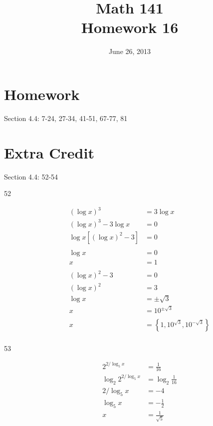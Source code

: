 \documentclass{exam}
\date{June 26, 2013}
\author{}
\title{Math 141 \\ Homework 16}
\begin{document}
    \maketitle

    \section{Homework}

    Section 4.4: 7-24, 27-34, 41-51, 67-77, 81

    \section{Extra Credit}
    Section 4.4: 52-54

    \ifprintanswers
      \begin{description}
        \item[52] 
          \begin{align*}
            (\log x)^3                &= 3 \log x \\
            (\log x)^3 - 3 \log x     &= 0 \\
            \log x \left[(\log x)^2 - 3 \right] &= 0 \\
            \\
            \log x &= 0 \\
            x      &= 1 \\
            \\
            (\log x)^2 - 3 &= 0 \\
            (\log x)^2     &= 3 \\
            \log x         &= \pm \sqrt{3} \\
            x              &= 10^{\pm \sqrt{3}} \\
            \\
            x &= \boxed{\left\{ 1, 10^{\sqrt{3}}, 10^{ - \sqrt{3}} \right\} } \\
          \end{align*}
          
        \item[53] 
          \begin{align*}
            2^{2/\log_5 x}        &= \frac{1}{16} \\
            \log_2 2^{2/\log_5 x} &= \log_2 \frac{1}{16} \\
            2/\log_5 x            &= - 4 \\
            \log_5x               &= - \frac{1}{2} \\
            x                     &= \boxed{\frac{1}{\sqrt{5}}} \\
          \end{align*}


\end{description}
\end{document}
